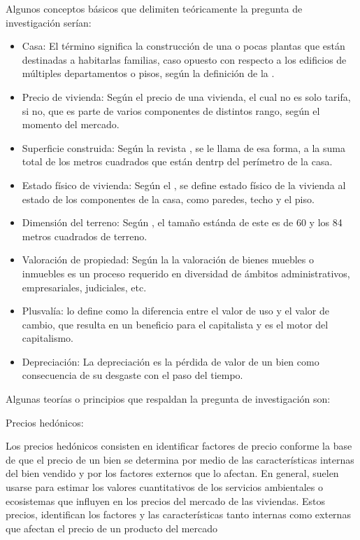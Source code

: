 \documentclass[
  oneside]{memoir}
\begin{document}
Algunos conceptos básicos que delimiten teóricamente la pregunta de
investigación serían:

\begin{itemize}
\item Casa: El término significa la construcción de una o pocas plantas que están destinadas a habitarlas familias, caso opuesto con respecto a los edificios de múltiples departamentos o pisos, según la definición de la \citep{RAE}.

\item Precio de vivienda: Según \citet{Bueno}
el precio de una vivienda, el cual no es solo tarifa, si no, que es parte de varios componentes de distintos rango, según el momento del mercado. 

\item Superficie construida: Según la revista \citet{AD}, se le llama de esa forma, a la suma total de los metros cuadrados que están dentrp del perímetro de la casa.

\item Estado físico de vivienda: Según el \citet{INEC}, se define estado físico de la vivienda al estado de los componentes de la casa, como paredes, techo y el piso.

\item Dimensión del terreno: Según \citet{Maria}, el tamaño estánda de este es de 60 y los 84 metros cuadrados de terreno.

\item Valoración de propiedad: Según la \citet{Consultoria} la valoración de bienes muebles o inmuebles es un proceso requerido en diversidad de ámbitos administrativos, empresariales, judiciales, etc.

\item Plusvalía: \citet{Max} lo define como la diferencia entre el valor de uso y el valor de cambio, que resulta en un beneficio para el capitalista y es el motor del capitalismo.

\item Depreciación: La depreciación es la pérdida de valor de un bien como consecuencia de su desgaste con el paso del tiempo. \citep{Roberto}
\end{itemize}

Algunas teorías o principios que respaldan la pregunta de investigación
son:

Precios hedónicos:

Los precios hedónicos consisten en identificar factores de precio
conforme la base de que el precio de un bien se determina por medio de
las características internas del bien vendido y por los factores
externos que lo afectan. En general, suelen usarse para estimar los
valores cuantitativos de los servicios ambientales o ecosistemas que
influyen en los precios del mercado de las viviendas. Estos precios,
identifican los factores y las características tanto internas como
externas que afectan el precio de un producto del mercado
\end{document}
